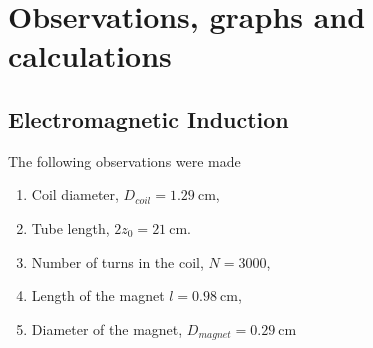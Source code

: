 \documentclass[%
 aip,
 amsmath,amssymb,
 reprint, floatfix%
]{revtex4-1}
\begin{document}
\section{Observations, graphs and calculations}
    \subsection{Electromagnetic Induction}
    The following observations were made
    \begin{enumerate}
        \item Coil diameter, $D_{coil} = \SI{1.29}{\centi \metre}$,
        \item Tube length, $2z_0 = \SI{21}{\centi \metre}$.
        \item Number of turns in the coil, $N = 3000$,
        \item Length of the magnet $l = \SI{0.98}{\centi \metre}$,
        \item Diameter of the magnet, $D_{magnet} = \SI{0.29}{\centi \metre}$
    \end{enumerate}
\end{document}
